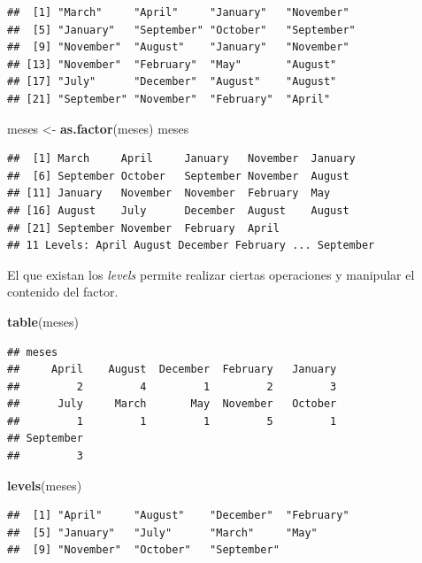 \documentclass[
]{book}
\newenvironment{Shaded}{\begin{snugshade}}{\end{snugshade}}
\newcommand{\FunctionTok}[1]{\textcolor[rgb]{0.13,0.29,0.53}{\textbf{#1}}}
\newcommand{\NormalTok}[1]{#1}
\newcommand{\OtherTok}[1]{\textcolor[rgb]{0.56,0.35,0.01}{#1}}
\begin{document}
\begin{verbatim}
##  [1] "March"     "April"     "January"   "November" 
##  [5] "January"   "September" "October"   "September"
##  [9] "November"  "August"    "January"   "November" 
## [13] "November"  "February"  "May"       "August"   
## [17] "July"      "December"  "August"    "August"   
## [21] "September" "November"  "February"  "April"
\end{verbatim}

\begin{Shaded}
\begin{Highlighting}[]
\NormalTok{meses }\OtherTok{\textless{}{-}} \FunctionTok{as.factor}\NormalTok{(meses)}
\NormalTok{meses}
\end{Highlighting}
\end{Shaded}

\begin{verbatim}
##  [1] March     April     January   November  January  
##  [6] September October   September November  August   
## [11] January   November  November  February  May      
## [16] August    July      December  August    August   
## [21] September November  February  April    
## 11 Levels: April August December February ... September
\end{verbatim}

El que existan los \emph{levels} permite realizar ciertas operaciones y manipular el contenido del factor.

\begin{Shaded}
\begin{Highlighting}[]
\FunctionTok{table}\NormalTok{(meses)}
\end{Highlighting}
\end{Shaded}

\begin{verbatim}
## meses
##     April    August  December  February   January 
##         2         4         1         2         3 
##      July     March       May  November   October 
##         1         1         1         5         1 
## September 
##         3
\end{verbatim}

\begin{Shaded}
\begin{Highlighting}[]
\FunctionTok{levels}\NormalTok{(meses)}
\end{Highlighting}
\end{Shaded}

\begin{verbatim}
##  [1] "April"     "August"    "December"  "February" 
##  [5] "January"   "July"      "March"     "May"      
##  [9] "November"  "October"   "September"
\end{verbatim}
\end{document}
